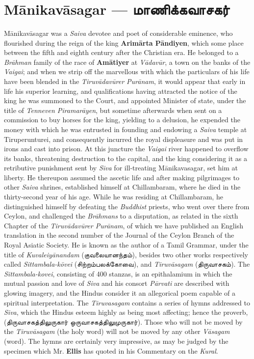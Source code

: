 \documentclass{article}
\newcommand{\TamilText}[1]{\texttamil{#1}}
\newcommand{\TamilBold}[1]{\texttamil{\textbf{#1}}}
\newcommand{\tam}[1]{\TamilText{#1}}
\newcommand{\tambold}[1]{\TamilBold{#1}}
\begin{document}
\section{M\={a}nikav\={a}sagar --- \tambold{மாணிக்கவாசகர்}}
\paragraph{}
M\={a}nikav\={a}sagar was a \emph{Saiva} devotee and poet of considerable eminence, who flourished during the reign of the king \textbf{Arim\={a}rta P\={a}ndiyen}, which some place between the fifth and eighth century after the Christian era. He belonged to a \emph{Br\={a}hman} family of the race of \textbf{Am\={a}tiyer} at \emph{V\={a}dav\={u}r}, a town on the banks of the \emph{Vaigai}; and when we strip off the marvellous with which the particulars of his life have been blended in the \emph{Tiruv\={a}dav\={u}rer Pur\={a}nam}, it would appear that early in life his superior learning, and qualifications having attracted the notice of the king he was summoned to the Court, and appointed Minister of state, under the title of \emph{Tenneven Piramar\={a}yen}, but sometime afterwards when sent on a commission to buy horses for the king, yielding to a delusion, he expended the money with which he was entrusted in founding and endowing a \emph{Saiva} temple at Tiruperunturei, and consequently incurred the royal displeasure and was put in irons and cast into prison. At this juncture the \emph{Vaigai} river happened to overflow its banks, threatening destruction to the capital, and the king considering it as a retributive punishment sent by \emph{Siva} for ill-treating M\={a}nikavasagar, set him at liberty. He thereupon assumed the ascetic life and after making pilgrimages to other \emph{Saiva} shrines, established himself at Chillambaram, where he died in the thirty-second year of his age. While he was residing at Chillambaram, he distinguished himself by defeating the \emph{Buddhist} priests, who went over there from Ceylon, and challenged the \emph{Br\={a}hmans} to a disputation, as related in the sixth Chapter of the \emph{Tiruv\={a}dav\={u}rer Pur\={a}nam}, of which we have published an English translation in the second number of the Journal of the Ceylon Branch of the Royal Asiatic Society. He is known as the author of a Tamil Grammar, under the title of \emph{Kuvaleiy\={a}nandam} (\tam{குவலையானந்தம்}), besides two other works respectively called \emph{Sittambala-k\={o}vei} (\tam{சிற்றம்பலக்கோவை}), and \emph{Tiruv\={a}sagam} (\tam{திருவாசகம்}). The \emph{Sittambala-kovei}, consisting of 400 stanzas, is an epithalamium in which the mutual passion and love of \emph{Siva} and his consort \emph{P\={a}rvati} are described with glowing imagery, and the Hindus consider it an allegorical poem capable of a spiritual interpretation. The \emph{Tiruvasagam} contains a series of hymns addressed to \emph{Siva}, which the Hindus esteem highly as being most affecting; hence the proverb, (\tam{திருவாசகத்திலுருகார் ஒருவாசகத்திலுமுருகார்}). Those who will not be moved by the \emph{Tiruv\={a}sagam} (the holy word) will not be moved by any other \emph{V\={a}sagam} (word). The hymns are certainly very impressive, as may be judged by the specimen which Mr. \textbf{Ellis} has quoted in his Commentary on the \emph{Kural}.
\end{document}
